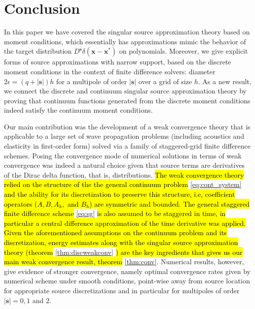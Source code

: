 \section{Conclusion}

In this paper we have covered the singular source approximation theory
based on moment conditions, which essentially has approximations mimic 
the behavior of the target distribution $D^{\mathbf s}\delta(\mathbf x-\mathbf x^*)$ on polynomials.
Moreover, we give explicit forms of source approximations with narrow support,
based on the discrete moment conditions in the context of finite difference solvers:
diameter $2\epsilon = (q+|\mathbf s|) h$ for a multipole of order $|\mathbf s|$
over a grid of size $h$.
As a new result, we connect the discrete and continuum singular source approximation
theory by proving that continuum functions generated from the discrete moment conditions 
indeed satisfy the continuum moment conditions.

Our main contribution was the development of a weak convergence theory that is applicable to a large set of wave propagation problems (including acoustics and elasticity in first-order form) solved via a family of staggered-grid finite difference schemes.%
Posing the convergence mode of numerical solutions in terms of weak convergence was indeed a natural choice given that source terms are derivatives of the Dirac delta function, that is, distributions.
\hl{
The weak convergence theory relied on the structure of the the general continuum problem} \ref{eq:cont_system} \hl{and the ability for its discretization to preserve this structure, i.e, coefficient operators ($A,B,A_h,$ and $B_h$) are symmetric and bounded.%
The general staggered finite difference scheme} \ref{eq:sg} \hl{is also assumed to be staggered in time, in particular a central difference approximation of the time derivative was applied.
Given the aforementioned assumptions on the continuum problem and its discretization, energy estimates along with the singular source approximation theory (theorem }\ref{thm:discweakconv} \hl{) are the key ingredients that gives us our main weak convergence result, theorem} \ref{thm:conv}.
Numerical results, however, give evidence of stronger convergence, namely 
optimal convergence rates given by numerical scheme under smooth conditions,
point-wise away from source location for appropriate source discretizations and
in particular for multipoles of order $|\mathbf s |=0,1$ and $2$.






